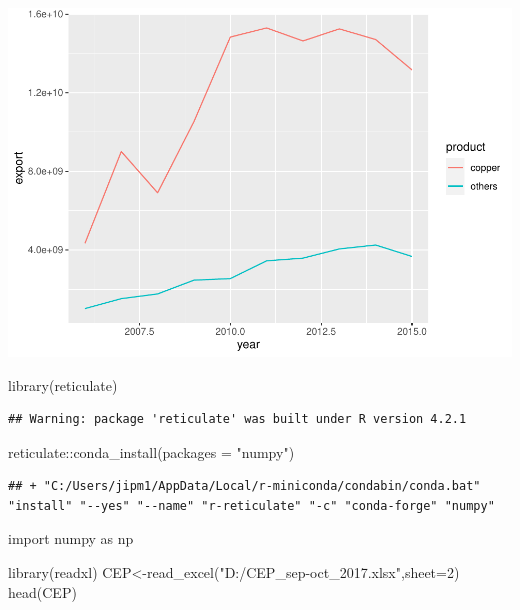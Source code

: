 \documentclass[
]{article}
\newenvironment{Shaded}{\begin{snugshade}}{\end{snugshade}}
\newcommand{\AttributeTok}[1]{\textcolor[rgb]{0.77,0.63,0.00}{#1}}
\newcommand{\DecValTok}[1]{\textcolor[rgb]{0.00,0.00,0.81}{#1}}
\newcommand{\FunctionTok}[1]{\textcolor[rgb]{0.00,0.00,0.00}{#1}}
\newcommand{\ImportTok}[1]{#1}
\newcommand{\NormalTok}[1]{#1}
\newcommand{\OtherTok}[1]{\textcolor[rgb]{0.56,0.35,0.01}{#1}}
\newcommand{\SpecialCharTok}[1]{\textcolor[rgb]{0.00,0.00,0.00}{#1}}
\newcommand{\StringTok}[1]{\textcolor[rgb]{0.31,0.60,0.02}{#1}}
\begin{document}
\includegraphics{practica1_files/figure-latex/unnamed-chunk-8-1.pdf}

\begin{Shaded}
\begin{Highlighting}[]
\FunctionTok{library}\NormalTok{(reticulate)}
\end{Highlighting}
\end{Shaded}

\begin{verbatim}
## Warning: package 'reticulate' was built under R version 4.2.1
\end{verbatim}

\begin{Shaded}
\begin{Highlighting}[]
\NormalTok{reticulate}\SpecialCharTok{::}\FunctionTok{conda\_install}\NormalTok{(}\AttributeTok{packages =} \StringTok{"numpy"}\NormalTok{)}
\end{Highlighting}
\end{Shaded}

\begin{verbatim}
## + "C:/Users/jipm1/AppData/Local/r-miniconda/condabin/conda.bat" "install" "--yes" "--name" "r-reticulate" "-c" "conda-forge" "numpy"
\end{verbatim}

\begin{Shaded}
\begin{Highlighting}[]
\ImportTok{import}\NormalTok{ numpy }\ImportTok{as}\NormalTok{ np}
\end{Highlighting}
\end{Shaded}

\begin{Shaded}
\begin{Highlighting}[]
\FunctionTok{library}\NormalTok{(readxl)}
\NormalTok{CEP}\OtherTok{\textless{}{-}}\FunctionTok{read\_excel}\NormalTok{(}\StringTok{"D:/CEP\_sep{-}oct\_2017.xlsx"}\NormalTok{,}\AttributeTok{sheet=}\DecValTok{2}\NormalTok{)}
\FunctionTok{head}\NormalTok{(CEP)}
\end{Highlighting}
\end{Shaded}
\end{document}

